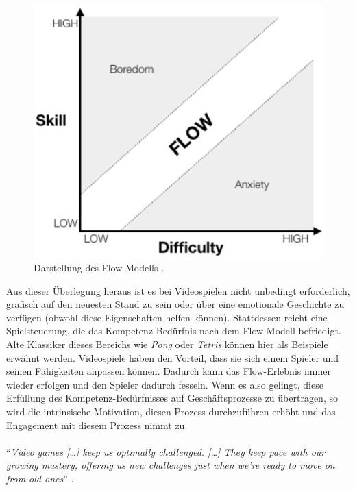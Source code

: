 \documentclass[a4paper,12pt,twoside]{scrartcl}
\begin{document}
\begin{figure}[h!]
\begin{center}
\includegraphics[scale = 0.6]{Bilder/FlowModel.eps}
\caption{Darstellung des Flow Modells \cite{FlowModel}.}
\label{FlowModelBild}
\end{center}
\end{figure}
Aus dieser Überlegung heraus ist es bei Videospielen nicht unbedingt erforderlich, grafisch auf den neuesten Stand zu sein oder über eine emotionale Geschichte zu verfügen (obwohl diese Eigenschaften helfen können). Stattdessen reicht eine Spielsteuerung, die das Kompetenz-Bedürfnis nach dem Flow-Modell befriedigt. Alte Klassiker dieses Bereichs wie \textit{Pong} oder \textit{Tetris} können hier als Beispiele erwähnt werden. Videospiele haben den Vorteil, dass sie sich einem Spieler und seinen Fähigkeiten anpassen können. Dadurch kann das Flow-Erlebnis immer wieder erfolgen und den Spieler dadurch fesseln. Wenn es also gelingt, diese Erfüllung des Kompetenz-Bedürfnisses auf Geschäftsprozesse zu übertragen, so wird die intrinsische Motivation, diesen Prozess durchzuführen erhöht und das Engagement mit diesem Prozess nimmt zu.
\\\\ 
\enquote{\textit{Video games […] keep us optimally challenged. […] They keep pace with our growing mastery, offering us new challenges just when we’re ready to move on from old ones}} \cite{Rigby2011}.
\\\\
\end{document}
